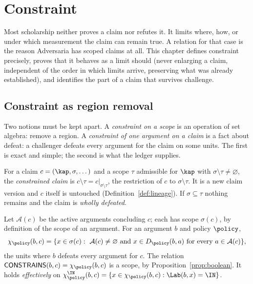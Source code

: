 \chapter{Constraint}\label{ch:constraint}

Most scholarship neither proves a claim nor refutes it. It limits where, how, or under which measurement the claim can remain true. A relation for that case is the reason Adversaria has scoped claims at all. This chapter defines constraint precisely, proves that it behaves as a limit should (never enlarging a claim, independent of the order in which limits arrive, preserving what was already established), and identifies the part of a claim that survives challenge.

\section{Constraint as region removal}

Two notions must be kept apart. A \emph{constraint on a scope} is an operation of set algebra: remove a region. A \emph{constraint of one argument on a claim} is a fact about defeat: a challenger defeats every argument for the claim on some units. The first is exact and simple; the second is what the ledger supplies.

\begin{definition}\label{def:constrained}
For a claim $c=(\kap,\sigma,\dots)$ and a scope $\tau$ admissible for $\kap$ with $\sigma\setminus\tau\ne\varnothing$, the \emph{constrained claim} is $c\setminus\tau=c|_{\sigma\setminus\tau}$, the restriction of $c$ to $\sigma\setminus\tau$. It is a new claim version and $c$ itself is untouched (Definition~\ref{def:lineage}). If $\sigma\subseteq\tau$ nothing remains and the claim is \emph{wholly defeated}.
\end{definition}

\begin{definition}[Constrains]\label{def:constrains}
Let $\mathcal A(c)$ be the active arguments concluding $c$; each has scope $\sigma(c)$, by definition of the scope of an argument. For an argument $b$ and policy $\policy$,
\[
\chi_\policy(b,c)=\{x\in\sigma(c):\ \mathcal A(c)\ne\varnothing\ \text{and}\ x\in D_\policy(b,a)\ \text{for every }a\in\mathcal A(c)\},
\]
the units where $b$ defeats every argument for $c$. The relation $\textsf{CONSTRAINS}(b,c)=\chi_\policy(b,c)$ is a scope, by Proposition~\ref{prop:boolean}. It holds \emph{effectively} on $\chi^{\IN}_\policy(b,c)=\{x\in\chi_\policy(b,c):\Lab(b,x)=\IN\}$.
\end{definition}

